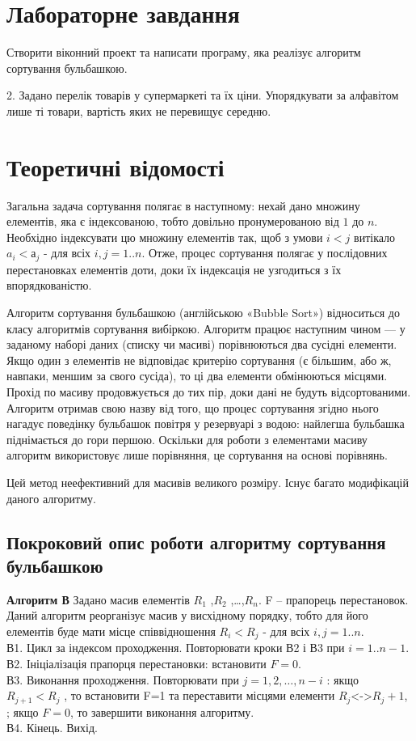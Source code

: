 \documentclass{article}
\begin{document}
\begin{normalsize}
	\section*{Лабораторне завдання}
	Створити віконний проект та написати програму, яка реалізує алгоритм сортування бульбашкою.
	\begin{center}
		2. Задано перелік товарів у супермаркеті та їх ціни. Упорядкувати за алфавітом лише ті товари, вартість яких не перевищує середню.
	\end{center}
	
	\section*{Теоретичні відомості}
	Загальна задача сортування полягає в наступному: нехай дано множину елементів, яка є індексованою, тобто довільно пронумерованою від $1$ до $n$. Необхідно індексувати цю множину елементів так, щоб з умови $i<j$ витікало $a_i < а_j$ - для всіх $i,j=1..n$. Отже, процес сортування полягає у послідовних перестановках елементів доти, доки їх індексація не узгодиться з їх впорядкованістю.
	
	Алгоритм сортування бульбашкою (англійською «Bubble Sort») відноситься до класу алгоритмів сортування вибіркою. Алгоритм працює наступним чином — у заданому наборі даних (списку чи масиві) порівнюються два сусідні елементи. Якщо один з елементів не відповідає критерію сортування (є більшим, або ж, навпаки, меншим за свого сусіда), то ці два елементи обмінюються місцями. Прохід по масиву продовжується до тих пір, доки дані не будуть відсортованими. 
	Алгоритм отримав свою назву від того, що процес сортування згідно нього нагадує поведінку бульбашок повітря у резервуарі з водою: найлегша бульбашка піднімається до гори першою. Оскільки для роботи з елементами масиву алгоритм використовує лише порівняння, це сортування на основі порівнянь.
	
	Цей метод неефективний для масивів великого розміру. Існує багато модифікацій даного алгоритму.
	
	\subsection*{Покроковий опис роботи алгоритму сортування бульбашкою}
	\textbf{Алгоритм В}
	Задано масив елементів $R_1$ ,$R_2$ ,…,$R_n$. F – прапорець перестановок.\\
	Даний алгоритм реорганізує масив у висхідному порядку, тобто для його елементів буде мати місце співвідношення $R_i < R_j$ - для всіх $i,j=1..n$.\\
	В1. Цикл за індексом проходження. Повторювати кроки В2 і В3 при $i=1..n-1$.\\
	В2. Ініціалізація прапорця перестановки: встановити $F=0$.\\
	В3. Виконання проходження. Повторювати при $j=1,2,…,n-i$ : якщо $R_{j+1} < R_j$ , то встановити F=1 та переставити місцями елементи $R_j$<->$R_j+1$, ; якщо $F=0$, то завершити виконання алгоритму. \\
	В4. Кінець. Вихід.
	

\end{normalsize}
\end{document}
